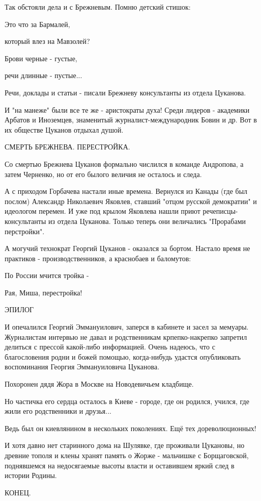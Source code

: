 Так обстояли дела и с Брежневым. Помню детский стишок:

Это что за Бармалей,

который влез на Мавзолей?

Брови черные - густые,

речи длинные - пустые...

Речи, доклады и статьи - писали Брежневу консультанты из отдела Цуканова.

И "на манеже" были все те же - аристократы духа! Среди лидеров - академики
Арбатов и Иноземцев, знаменитый журналист-международник Бовин и др. Вот в их
обществе Цуканов отдыхал душой.

СМЕРТЬ БРЕЖНЕВА. ПЕРЕСТРОЙКА.

Со смертью Брежнева Цуканов формально числился в команде Андропова, а затем
Черненко, но от его былого величия не осталось и следа.

А с приходом Горбачева настали иные времена. Вернулся из Канады (где был
послом) Александр Николаевич Яковлев, ставший "отцом русской демократии" и
идеологом перемен. И уже под крылом Яковлева нашли приют речеписцы-консультанты
из отдела Цуканова. Только теперь они величались "Прорабами перстройки".

А могучий технократ Георгий Цуканов - оказался за бортом. Настало время не
практиков - производственников, а краснобаев и баломутов:

По России мчится тройка -

Рая, Миша, перестройка!

ЭПИЛОГ

И опечалился Георгий Эммануилович, заперся в кабинете и засел за мемуары.
Журналистам интервью не давал и родственникам крпепко-накрепко запретил
делиться с прессой какой-либо информацией. Очень надеюсь, что с благословения
родни и божей помощью, когда-нибудь удастся опубликовать воспоминания Георгия
Эммануиловича Цуканова.

Похоронен дядя Жора в Москве на Новодевичьем кладбище. 

Но частичка его сердца осталось в Киеве - городе, где он родился, учился, где
жили его родственники и друзья...

Ведь был он киевлянином в нескольких поколениях. Ещё тех дореволюционных!

И хотя давно нет старинного дома на Шулявке, где проживали Цукановы, но древние
тополя и клены хранят память о Жорже - мальчишке с Борщаговской, поднявшемся на
недосягаемые высоты власти и оставившем яркий след в истории Родины.

КОНЕЦ.

